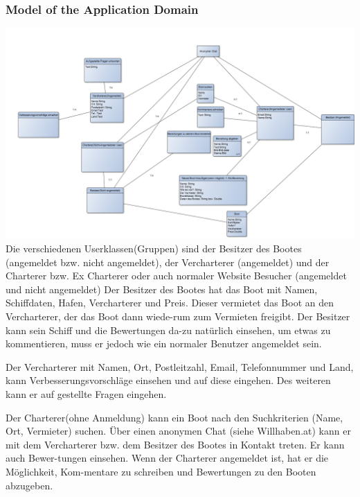 \documentclass[12pt]{article}
\theoremstyle{definition}
\begin{document}
\subsubsection{Model of the Application Domain}
	\includegraphics[height=0.50\textwidth]{SysUML.PNG}
	Die verschiedenen Userklassen(Gruppen) sind der Besitzer des Bootes (angemeldet bzw. nicht angemeldet), der Vercharterer (angemeldet) und der Charterer bzw. Ex Charterer oder auch normaler Website Besucher (angemeldet und nicht angemeldet)
	Der Besitzer des Bootes hat das Boot mit Namen, Schiffdaten, Hafen, Vercharterer und Preis. Dieser vermietet das Boot an den Vercharterer, der das Boot dann wiede-rum zum Vermieten freigibt.  Der Besitzer kann sein Schiff und die Bewertungen da-zu natürlich einsehen, um etwas zu kommentieren, muss er jedoch wie ein normaler Benutzer angemeldet sein.

	Der Vercharterer mit Namen, Ort, Postleitzahl, Email, Telefonnummer und Land, kann Verbesserungsvorschläge einsehen und auf diese eingehen. Des weiteren kann er auf gestellte Fragen eingehen.

	Der Charterer(ohne Anmeldung) kann ein Boot nach den Suchkriterien (Name, Ort, Vermieter) suchen. Über einen anonymen Chat (siehe Willhaben.at) kann er mit dem Vercharterer bzw. dem Besitzer des Bootes in Kontakt treten. Er kann auch Bewer-tungen einsehen. Wenn der Charterer angemeldet ist, hat er die Möglichkeit, Kom-mentare zu schreiben und Bewertungen zu den Booten abzugeben. 
\end{document}
